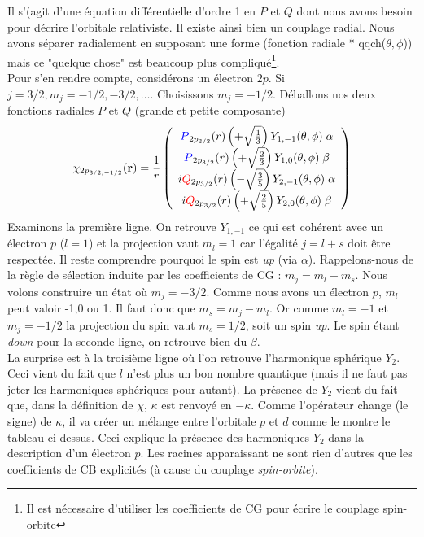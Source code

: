 Il s'(agit d'une équation différentielle d'ordre 1 en $P$ et $Q$ dont nous avons besoin pour
décrire l'orbitale relativiste. Il existe ainsi bien un couplage radial. Nous avons séparer radialement en supposant une forme (fonction radiale * qqch($\theta,\phi$)) mais ce "quelque chose"
est beaucoup plus compliqué\footnote{Il est nécessaire d'utiliser les coefficients de CG pour écrire
le couplage spin-orbite}.\\
 
Pour s'en rendre compte, considérons un électron $2p$. Si $j=3/2, m_j = -1/2,-3/2,\dots$. Choisissons
$m_j = -1/2$. Déballons nos deux fonctions radiales $P$ et $Q$ (grande et petite composante)
\begin{equation}
\chi_{2p_{{3/2}, -1/2}} ({\bf r}) =\frac{1}{r} \left( \begin{array}{c}
 {\color{blue} P}_{2p_{3/2} }(r) \left(   +\sqrt{\frac{1}{3} } \right) Y_{1,-1} (\theta, \phi)\;  \alpha \\ 
 {\color{blue} P}_{2p_{3/2} }(r) \left(   +\sqrt{\frac{2}{3} } \right) Y_{1,0} (\theta, \phi)\;  \beta \\ 
 i {\color{red} Q}_{2p_{3/2} } (r) \left(   -\sqrt{\frac{3}{5} } \right) Y_{2,-1} (\theta, \phi)\;  \alpha  \\
  i {\color{red} Q}_{2p_{3/2} } (r)  \left(  + \sqrt{\frac{2}{5} } \right) Y_{2,0} (\theta, \phi)\;  \beta \end{array} \right)
\end{equation}
Examinons la première ligne. On retrouve $Y_{1,-1}$ ce qui est cohérent avec un électron $p$ ($l=1$)
et la projection vaut $m_l=1$ car l'égalité $j=l+s$ doit être respectée. Il reste comprendre pourquoi
le spin est \textit{up} (via $\alpha$). Rappelons-nous de la règle de sélection induite par les
coefficients de CG : $m_j=m_l+m_s$. Nous volons construire un état où $m_j = -3/2$. Comme nous avons
un électron $p$, $m_l$ peut valoir -1,0 ou 1. Il faut donc que $m_s=m_j-m_l$. Or comme $m_l=-1$ et 
$m_j=-1/2$ la projection du spin vaut $m_s=1/2$, soit un spin \textit{up}. Le spin étant \textit{down}
pour la seconde ligne, on retrouve bien du $\beta$.\\

La surprise est à la troisième ligne où l'on retrouve l'harmonique sphérique $Y_2$. Ceci vient du fait
que $l$ n'est plus un bon nombre quantique (mais il ne faut pas jeter les harmoniques sphériques pour
autant). La présence de $Y_2$ vient du fait que, dans la définition de $\chi$, $\kappa$ est renvoyé
en $-\kappa$.  Comme l'opérateur change (le signe) de $\kappa$, il va créer un mélange entre 
l'orbitale $p$ et $d$ comme le montre le tableau ci-dessus. Ceci explique la présence des harmoniques
$Y_2$ dans la description d'un électron $p$. Les racines apparaissant ne sont rien d'autres que les
coefficients de CB explicités (à cause du couplage \textit{spin-orbite}).


